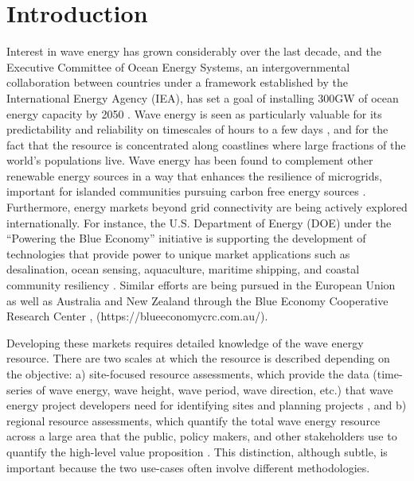\section{Introduction}

Interest in wave energy has grown considerably over the last decade, and the Executive Committee of Ocean Energy Systems, an intergovernmental collaboration between countries under a framework established by the International Energy Agency (IEA), has set a goal of installing 300GW of ocean energy capacity by 2050 \citep[]{babaritOceanWaveEnergy2017,huckerbyInternationalVisionOcean2017}. Wave energy is seen as particularly valuable for its predictability and reliability on timescales of hours to a few days \citep{parkinsonIntegratingOceanWave2015}, and for the fact that the resource is concentrated along coastlines where large fractions of the world's populations live. Wave energy has been found to complement other renewable energy sources in a way that enhances the resilience of microgrids, important for islanded communities pursuing carbon free energy sources \citep[e.g.][]{newman_evaluating_2022}. Furthermore, energy markets beyond grid connectivity are being actively explored internationally. For instance, the U.S. Department of Energy (DOE) under the ``Powering the Blue Economy'' initiative  is supporting the development of technologies that provide power to unique market applications such as desalination, ocean sensing, aquaculture, maritime shipping, and coastal community resiliency \citep{livecchiPoweringBlueEconomy2019}. Similar efforts are being pursued in the European Union as well as Australia and New Zealand through the Blue Economy Cooperative Research Center \citep{europeancommission2021EUBlueEconomy2021}, (https://blueeconomycrc.com.au/).

Developing these markets requires detailed knowledge of the wave energy resource. There are two scales at which the resource is described depending on the objective: a) site-focused resource assessments, which provide the data (time-series of wave energy, wave height, wave period, wave direction, etc.) that wave energy project developers need for identifying sites and planning projects \citep[e.g., ][]{internationalelectrotechnicalcommissionPart101Wave2015, robertsonCharacterizingShoreWave2014, kumarWaveEnergyResource2015}, and b) regional resource assessments, which quantify the total wave energy resource across a large area that the public, policy makers, and other stakeholders use to quantify the high-level value proposition \citep[e.g., ][]{EPRIwaveresource2011, gunnQuantifyingGlobalWave2012, hemerRevisedAssessmentAustralia2017}. This distinction, although subtle, is important because the two use-cases often involve different methodologies.

